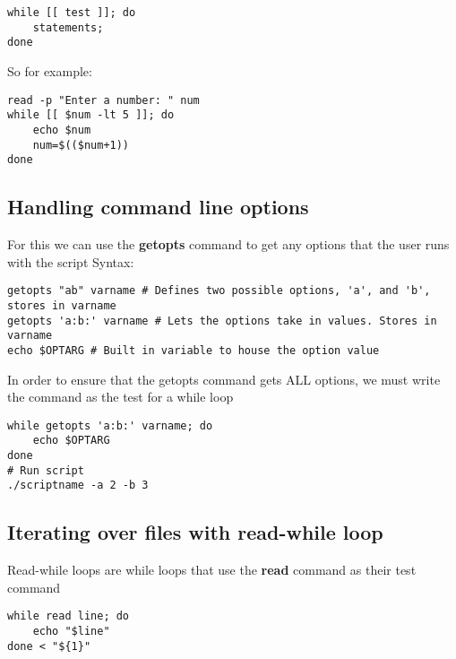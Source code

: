 \documentclass{report}
\begin{document}
    \begin{verbatim}
while [[ test ]]; do
    statements;
done
    \end{verbatim}
    \bigbreak \noindent
    
    \bigbreak \noindent 
    So for example:
    
    \begin{verbatim}
read -p "Enter a number: " num
while [[ $num -lt 5 ]]; do
    echo $num
    num=$(($num+1))
done
    \end{verbatim}
    \bigbreak \noindent
    


    \bigbreak \noindent 
    \subsection{Handling command line options}
    \bigbreak \noindent 
    For this we can use the \textbf{getopts} command to get any options that the user runs with the script
    \bigbreak \noindent 
    Syntax:
    
    \begin{verbatim}
getopts "ab" varname # Defines two possible options, 'a', and 'b', stores in varname
getopts 'a:b:' varname # Lets the options take in values. Stores in varname
echo $OPTARG # Built in variable to house the option value
    \end{verbatim}
    \bigbreak \noindent
    
    \bigbreak \noindent 
    In order to ensure that the getopts command gets ALL options, we must write the command as the test for a while loop
    
    \begin{verbatim}
while getopts 'a:b:' varname; do 
    echo $OPTARG
done
# Run script
./scriptname -a 2 -b 3
    \end{verbatim}
    \bigbreak \noindent
    

    \pagebreak \bigbreak \noindent 
    \subsection{Iterating over files with read-while loop}
    \bigbreak \noindent 
    \begin{concept}
        Read-while loops are while loops that use the \textbf{read} command as their test command
    \end{concept}
    
    \begin{verbatim}
while read line; do
    echo "$line"
done < "${1}"
    \end{verbatim}
    \bigbreak \noindent
    
\end{document}
